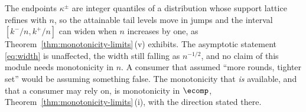 
\begin{remark}
\label{rem:n-nonmono}
The endpoints $\kappa^{\pm}$ are integer quantiles of a distribution whose
support lattice refines with $n$, so the attainable tail levels move in jumps
and the interval $[k^{-}/n,k^{+}/n]$ can widen when $n$ increases by one, as
Theorem~\ref{thm:monotonicity-limits}\,(v) exhibits. The asymptotic statement
\eqref{eq:width} is unaffected, the width still falling as $n^{-1/2}$, and
no claim of this module needs monotonicity in $n$. A consumer that assumed
``more rounds, tighter set'' would be assuming something false. The
monotonicity that \emph{is} available, and that a consumer may rely on, is
monotonicity in $\ecomp$, Theorem~\ref{thm:monotonicity-limits}\,(i), with the direction
stated there.
\end{remark}
